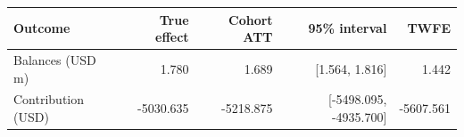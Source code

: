 \begin{tabular}{@{}lrrrr@{}}
\toprule
Outcome & True effect & Cohort ATT & 95\% interval & TWFE\\
\midrule
Balances (USD m) & 1.780 & 1.689 & [1.564, 1.816] & 1.442\\
Contribution (USD) & -5030.635 & -5218.875 & [-5498.095, -4935.700] & -5607.561\\
\bottomrule
\end{tabular}
